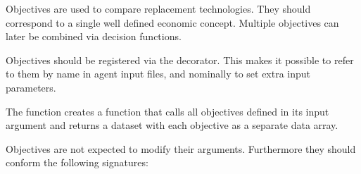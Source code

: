 \documentclass[letterpaper,10pt,english]{sphinxmanual}
\begin{document}
Objectives are used to compare replacement technologies. They should correspond to
a single well defined economic concept. Multiple objectives can later be combined
via decision functions.

Objectives should be registered via the
 decorator. This makes it possible to
refer to them by name in agent input files, and nominally to set extra input parameters.

The  function creates a function that calls all objectives defined in
its input argument and returns a dataset with each objective as a separate data array.

Objectives are not expected to modify their arguments. Furthermore they should
conform the following signatures:
\end{document}
